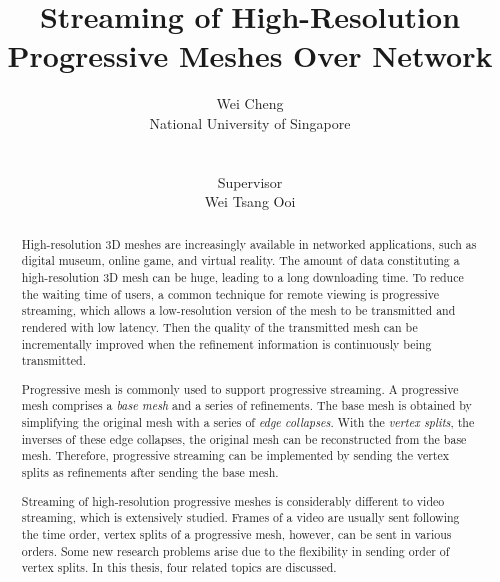 \documentclass[11pt, a4paper]{report}
\title{Streaming of High-Resolution Progressive Meshes Over Network}
\author{Wei Cheng\\
National University of Singapore\\
\\
\\
Supervisor\\
Wei Tsang Ooi}
\begin{document}
\maketitle
\doublespacing
\begin{abstract}
    High-resolution 3D meshes are increasingly available in networked
    applications, such as digital museum, online game, and virtual reality.
    The amount of data constituting a high-resolution 3D mesh can be
    huge, leading to a long downloading time. 
    To reduce the waiting time of users, 
    a common technique for remote viewing is progressive streaming,
    which allows a low-resolution version of the mesh to be transmitted
    and rendered with low latency. Then the quality of the transmitted 
    mesh can be incrementally improved when the refinement information
    is continuously being transmitted.

    Progressive mesh is commonly used to support progressive
    streaming. A progressive mesh comprises a \emph{base mesh} and a series
    of refinements. The base mesh is obtained by simplifying the original mesh
    with a series of \emph{edge collapses}.
    With the \emph{vertex splits}, the inverses of these edge
    collapses, the original mesh can be reconstructed from the base mesh.
    Therefore, progressive streaming can be implemented by sending the vertex
    splits as refinements after sending the base mesh.

    Streaming of high-resolution progressive meshes is considerably different
    to video streaming, which is extensively studied.
    Frames of a video are usually sent following the time order,
    vertex splits of a progressive mesh, however, can be sent in various orders.
    Some new research problems arise due to the flexibility in sending order of 
    vertex splits. In this thesis, four related topics are discussed. 
       

\end{abstract}
\end{document}
